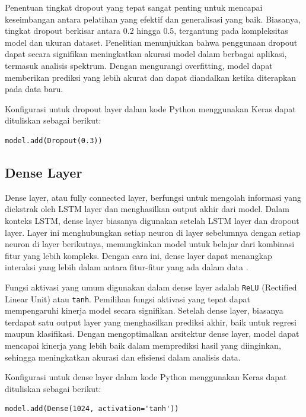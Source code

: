 \par Penentuan tingkat dropout yang tepat sangat penting untuk mencapai keseimbangan antara pelatihan yang efektif dan generalisasi yang baik. Biasanya, tingkat dropout berkisar antara 0.2 hingga 0.5, tergantung pada kompleksitas model dan ukuran dataset. Penelitian menunjukkan bahwa penggunaan dropout dapat secara signifikan meningkatkan akurasi model dalam berbagai aplikasi, termasuk analisis spektrum. Dengan mengurangi overfitting, model dapat memberikan prediksi yang lebih akurat dan dapat diandalkan ketika diterapkan pada data baru.

\par Konfigurasi untuk dropout layer dalam kode Python menggunakan Keras dapat dituliskan sebagai berikut:
\begin{minipage}{\textwidth}
\begin{verbatim}
model.add(Dropout(0.3))
\end{verbatim}
\end{minipage}

\subsection{Dense Layer}
\par Dense layer, atau fully connected layer, berfungsi untuk mengolah informasi yang diekstrak oleh LSTM layer dan menghasilkan output akhir dari model. Dalam konteks LSTM, dense layer biasanya digunakan setelah LSTM layer dan dropout layer. Layer ini menghubungkan setiap neuron di layer sebelumnya dengan setiap neuron di layer berikutnya, memungkinkan model untuk belajar dari kombinasi fitur yang lebih kompleks. Dengan cara ini, dense layer dapat menangkap interaksi yang lebih dalam antara fitur-fitur yang ada dalam data \cite{zhang2019}.

\par Fungsi aktivasi yang umum digunakan dalam dense layer adalah \texttt{ReLU} (Rectified Linear Unit) atau \texttt{tanh}. Pemilihan fungsi aktivasi yang tepat dapat mempengaruhi kinerja model secara signifikan. Setelah dense layer, biasanya terdapat satu output layer yang menghasilkan prediksi akhir, baik untuk regresi maupun klasifikasi. Dengan mengoptimalkan arsitektur dense layer, model dapat mencapai kinerja yang lebih baik dalam memprediksi hasil yang diinginkan, sehingga meningkatkan akurasi dan efisiensi dalam analisis data.

\par Konfigurasi untuk dense layer dalam kode Python menggunakan Keras dapat dituliskan sebagai berikut:
\begin{minipage}{\textwidth}
\begin{verbatim}
model.add(Dense(1024, activation='tanh'))
\end{verbatim}
\end{minipage}

